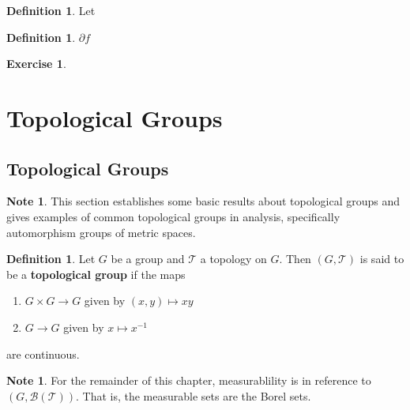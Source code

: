 \documentclass[12pt]{amsart}
\theoremstyle{definition}
\newtheorem{defn}[definition]{Definition}
\newtheorem{note}[definition]{Note}
\newtheorem{ex}[definition]{Exercise}
\newcommand{\MB}{\mathcal{B}}
\newcommand{\MT}{\mathcal{T}}
\newcommand{\lex}[1]{\label{ex:#1}}
\newcommand{\ld}[1]{\label{defn:#1}}
\begin{document}
	
	
	
	
	
	
	
	\begin{defn} \ld{}
	Let 
	\end{defn}
	
	\begin{defn} \ld{}
	$\partial f$
	\end{defn}	
	
	\begin{ex} \lex{}
	
	\end{ex}
	
	
	
	
	
	
	
	
	
	
	
	
	
	
	
	
	
	
	
	
	
	\newpage
	\section{Topological Groups}
	
	
	
	\subsection{Topological Groups}
	\begin{note}
	This section establishes some basic results about topological groups and gives examples of common topological groups in analysis, specifically automorphism groups of metric spaces.  
	\end{note}
	
	\begin{defn} \ld{00000} 
		Let $G$ be a group and $\MT$ a topology on $G$. Then $(G, \MT)$ is said to be a \textbf{topological group} if the maps \begin{enumerate}
			\item $G \times G \rightarrow G$ given by $(x,y) \mapsto xy$
			\item  $G \rightarrow G$ given by $x \mapsto x^{-1}$ 
		\end{enumerate} are continuous.
	\end{defn}

	\begin{note}
		For the remainder of this chapter, measurablility is in reference to $(G, \MB(\MT))$. That is, the measurable sets are the Borel sets.
	\end{note}
	
\end{document}
